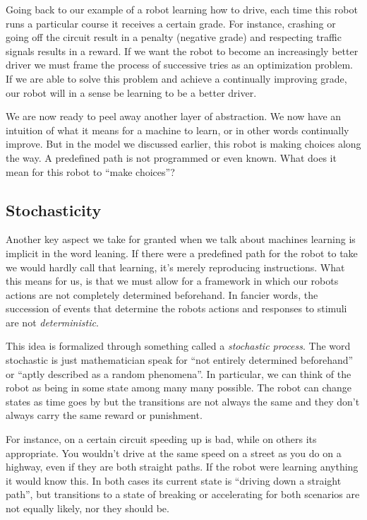 Going back to our example of a robot learning how to drive, each 
time this robot runs a particular course it receives a certain 
grade. For instance, crashing or going off the circuit result in 
a penalty (negative grade) and respecting traffic signals 
results in a reward.  If we want the robot to become an 
increasingly better driver we must frame the process of 
successive tries as an optimization problem. If we are able to 
solve this problem and achieve a continually improving grade, 
our robot will in a sense be learning to be a better driver.

We are now ready to peel away another layer of abstraction.  We 
now have an intuition of what it means for a machine to learn, 
or in other words continually improve. But in the model we 
discussed earlier, this robot is making choices along the way. A 
predefined path is not programmed or even known. What does it 
mean for this robot to ``make choices''?

\subsection{Stochasticity}
Another key aspect we take for granted when we talk about 
machines learning is implicit in the word leaning. If there were 
a predefined path for the robot to take we would hardly call 
that learning, it's merely reproducing instructions.  What this 
means for us, is that we must allow for a framework in which our 
robots actions are not completely determined beforehand. In 
fancier words, the succession of events that determine the 
robots actions and responses to stimuli are not 
\textit{deterministic}.

This idea is formalized through something called a 
\textit{stochastic process}. The word stochastic is just 
mathematician speak for ``not entirely determined beforehand'' 
or ``aptly described as a random phenomena''.  In particular, we 
can think of the robot as being in some state among many many 
possible. The robot can change states as time goes by but the 
transitions are not always the same and they don't always carry 
the same reward or punishment.

For instance, on a certain circuit speeding up is bad, while on 
others its appropriate. You wouldn't drive at the same speed on 
a street as you do on a highway, even if they are both straight 
paths.  If the robot were learning anything it would know this. 
In both cases its current state is ``driving down a straight 
path'', but transitions to a state of breaking or accelerating 
for both scenarios are not equally likely, nor they should be.

